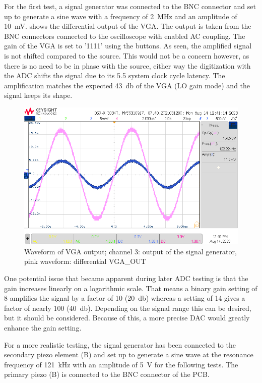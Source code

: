 \documentclass[
	english,
	ruledheaders=section, %
	class=report,%
	thesis={type=Project Seminar Report},%
	accentcolor=TUDa-1d, %
	custommargins=false,%
	marginpar=false,%
	parskip=half-,%
	fontsize=11pt,%
]{tudapub}
\begin{document}
For the first test, a signal generator was connected to the BNC connector and set up to generate a sine wave with a frequency of \SI{2}{\mega\hertz} and an amplitude of \SI{10}{\milli\volt}.  shows the differential output of the \gls{VGA}. The output is taken from the BNC connectors connected to the oscilloscope with enabled AC coupling.
The gain of the \gls{VGA} is set to '1111' using the buttons. As seen, the amplified signal is not shifted compared to the source. This would not be a concern however, as there is no need to be in phase with the source, either way the digitization with the \gls{ADC} shifts the signal due to its 5.5 system clock cycle latency. The amplification matches the expected \SI{43}{\decibel} of the \gls{VGA} (LO gain mode) and the signal keeps its shape.
\begin{figure}[h]
    \centering
    \includegraphics[width=0.8\columnwidth]{images/piezo_vga.png}
    \caption{Waveform of VGA output; channel 3: output of the signal generator, pink waveform: differential VGA\_OUT}
    \label{img:piezo_inbnc1}
\end{figure}
One potential issue that became apparent during later \gls{ADC} testing is that the gain increases linearly on a logarithmic scale. That means a binary gain setting of 8 amplifies the signal by a factor of 10 (\SI{20}{\decibel}) whereas a setting of 14 gives a factor of nearly 100 (\SI{40}{\decibel}). Depending on the signal range this can be desired, but it should be considered. Because of this, a more precise \gls{DAC} would greatly enhance the gain setting.

For a more realistic testing, the signal generator has been connected to the secondary piezo element (B) and set up to generate a sine wave at the resonance frequency of \SI{121}{\kilo\hertz} with an amplitude of \SI{5}{\volt} for the following tests. The primary piezo (B) is connected to the BNC connector of the \gls{PCB}.
\end{document}
